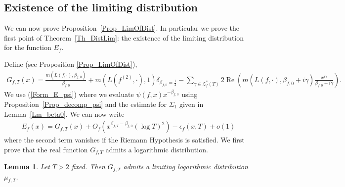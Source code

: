 \documentclass[a4paper,10pt]{amsart}
\theoremstyle{plain}
\newtheorem{lem}[theo]{Lemma}
\theoremstyle{definition}
\begin{document}
\subsection{Existence of the limiting distribution}\label{sub_ExistenceLimDist}

We can now prove Proposition~\ref{Prop_LimOfDist}. 
In particular we prove the first point of Theorem~\ref{Th_DistLim}: the existence of the limiting distribution for the function $E_{f}$.

Define (see Proposition \ref{Prop_LimOfDist}),
\begin{align*}
G_{f,T}(x) = \frac{m(L(f,\cdot),\beta_{f,0})}{\beta_{f,0}} + m(L(f^{(2)},\cdot),1)\delta_{\beta_{f,0}=\frac{1}{2}}
 -\sum_{ \gamma\in\mathcal{Z}_{f}^{*}(T)}2\operatorname{Re}\left(m(L(f,\cdot),\beta_{f,0} + i\gamma)\frac{x^{i\gamma}}{\beta_{f,0} + i\gamma}\right).
\end{align*}
We use (\ref{Form_E_psi}) where we evaluate $\psi(f,x)x^{-\beta_{f,0}}$ using Proposition~\ref{Prop_decomp_psi}
and the estimate for $\Sigma_{1}$ given in Lemma~\ref{Lm_beta0}.
We can now write
\begin{align}\label{Form_finale}
E_{f}(x)= G_{f,T}(x)
+ O_{f}\left(x^{\beta_{f,T}-\beta_{f,0}}(\log T)^2\right) 
- \epsilon_{f}(x,T)
 + o(1)
\end{align}
where the second term vanishes if the Riemann Hypothesis is satisfied.
We first prove that the real function $G_{f,T}$ admits a logarithmic distribution.

\begin{lem}\label{Lm_LimDistG}
Let $T>2$ fixed.
Then $G_{f,T}$ admits a limiting logarithmic distribution $\mu_{f,T}$.
\end{lem}
\end{document}
